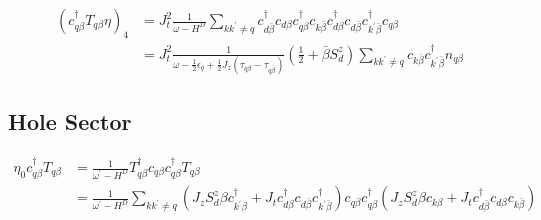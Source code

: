 \documentclass[14pt]{extarticle}
\numberwithin{equation}{section}
\begin{document}
\begin{subequations}
\begin{align}
\left( c^{\dag}_{q\beta}T_{q\beta}\eta \right)_4  &= J_t^2 \frac{1}{\omega - H^D} \sum\limits_{kk^{\prime}\ne q} c^{\dag}_{d\bar{\beta}} c_{d\beta} c^{\dag}_{q\beta}c_{k\bar{\beta}}  c^{\dag}_{d\beta} c_{d\bar{\beta}}  c^{\dag}_{k^{\prime}\bar{\beta}}c_{q\beta} \nonumber\\
&= J_t^2 \frac{1}{\omega - \frac{1}{2}\epsilon_q + \frac{1}{2} J_z \left( \tau_{q\beta} - \tau_{q\bar{\beta}} \right)} \left( \frac{1}{2} + \bar{\beta} S_d^z \right) \sum\limits_{kk^{\prime}\ne q} c_{k\bar{\beta}} c^{\dag}_{k^{\prime}\bar{\beta}}n_{q\beta} \label{eq:35}
\end{align}
\end{subequations}

\subsection{Hole Sector}
\begin{align}
 \eta_0 c^{\dag}_{q\beta}T_{q \beta} &=  \frac{1}{\omega^{\prime} - H^D} T_{q\beta}^{\dag}c_{q\beta} c^{\dag}_{q\beta}T_{q\beta}  \nonumber\\
&= \frac{1}{\omega^{\prime} - H^D} \sum\limits_{kk^{\prime}\ne q} \left(  J_z S_d^z \beta c_{k^{\prime}\beta}^{\dag} + J_t c^{\dag}_{d\beta} c_{d\bar{\beta}} c^{\dag}_{k^{\prime}\bar{\beta}}  \right) c_{q\beta} c^{\dag}_{q\beta}\left( J_z S_d^z \beta c_{k\beta} + J_t c^{\dag}_{d\bar{\beta}} c_{d\beta} c_{k\bar{\beta}} \right)  \label{eq:25}
\end{align}
\end{document}

